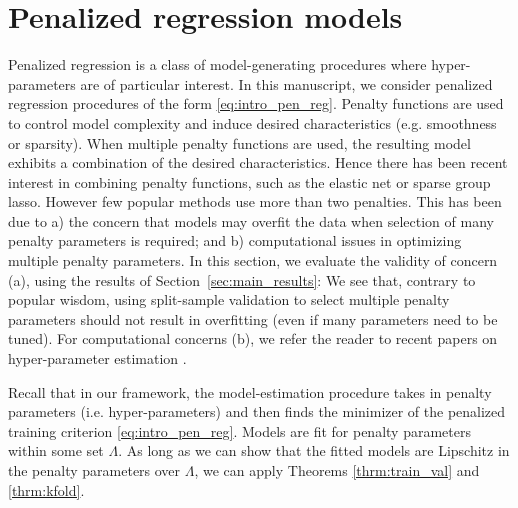 \documentclass[12pt]{article}
\begin{document}

\section{Penalized regression models}
\label{sec:examples}

Penalized regression is a class of model-generating procedures where hyper-parameters are of particular interest. In this manuscript, we consider penalized regression procedures of the form \eqref{eq:intro_pen_reg}. Penalty functions are used to control model complexity and induce desired characteristics (e.g. smoothness or sparsity). When multiple penalty functions are used, the resulting model exhibits a combination of the desired characteristics. Hence there has been recent interest in combining penalty functions, such as the elastic net or sparse group lasso. However few popular methods use more than two penalties. This has been due to a) the concern that models may overfit the data when selection of many penalty parameters is required; and b) computational issues in optimizing multiple penalty parameters. In this section, we evaluate the validity of concern (a), using the results of Section~\ref{sec:main_results}: We see that, contrary to popular wisdom, using split-sample validation to select multiple penalty parameters should not result in overfitting (even if many parameters need to be tuned). For computational concerns (b), we refer the reader to recent papers on hyper-parameter estimation \citep{bengio2000gradient, foo2008efficient, snoek2012practical}.

Recall that in our framework, the model-estimation procedure takes in penalty parameters (i.e. hyper-parameters) and then finds the minimizer of the penalized training criterion \eqref{eq:intro_pen_reg}. Models are fit for penalty parameters within some set $\Lambda$. As long as we can show that the fitted models are Lipschitz in the penalty parameters over $\Lambda$, we can apply Theorems \ref{thrm:train_val} and \ref{thrm:kfold}.
\end{document}

